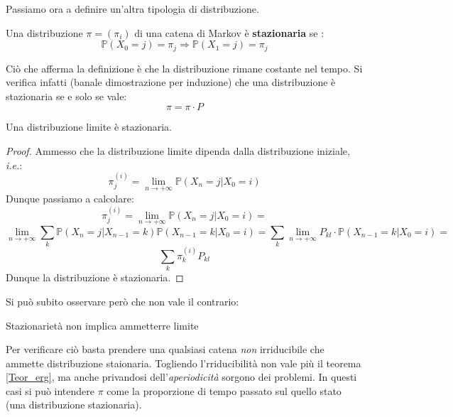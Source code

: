 Passiamo ora a definire un'altra tipologia di distribuzione.

\begin{definition}
Una distribuzione $\pi=(\pi_i)$ di una catena di Markov è \textbf{stazionaria} se
:
\[\mathbb{P}(X_0=j)=\pi_j \Rightarrow \mathbb{P}(X_1=j)=\pi_j \]
\end{definition}
Ciò che afferma la definizione è che la distribuzione rimane costante nel tempo. Si verifica infatti (banale dimostrazione per induzione) che una distribuzione è stazionaria se e solo se vale:
\[\pi=\pi \cdot P\]

\begin{proposition}
Una distribuzione limite è stazionaria.
\begin{proof}
Ammesso che la distribuzione limite dipenda dalla distribuzione iniziale, \textit{i.e.}:
\[\pi_j^{(i)}=\lim_{n\to+\infty}\mathbb{P}(X_n=j|X_0=i)\]
Dunque passiamo a calcolare:
\[\pi_j^{(i)}=\lim_{n\to+\infty}\mathbb{P}(X_n=j|X_0=i)=\]
\[\lim_{n\to+\infty}\sum_{k}\mathbb{P}(X_n=j|X_{n-1}=k)\mathbb{P}(X_{n-1}=k|X_0=i)=\sum_{k}\lim_{n\to+\infty}P_{kl}\cdot\mathbb{P}(X_{n-1}=k|X_0=i)=\]
\[\sum_k\pi_k^{(i)}P_{kl}\]
Dunque la distribuzione è stazionaria.
\end{proof}
\end{proposition}

Si può subito osservare però che non vale il contrario: 
\begin{center}
    Stazionarietà non implica ammetterre limite
\end{center}
Per verificare ciò basta prendere una qualsiasi catena \textit{non} irriducibile che ammette distribuzione staionaria.
Togliendo l'rriducibilità non vale più il teorema \ref{Teor_erg}, ma anche privandosi dell'\textit{aperiodicità} sorgono dei problemi. In questi casi si può intendere $\pi$ come la proporzione di tempo passato sul quello stato (una distribuzione stazionaria).

